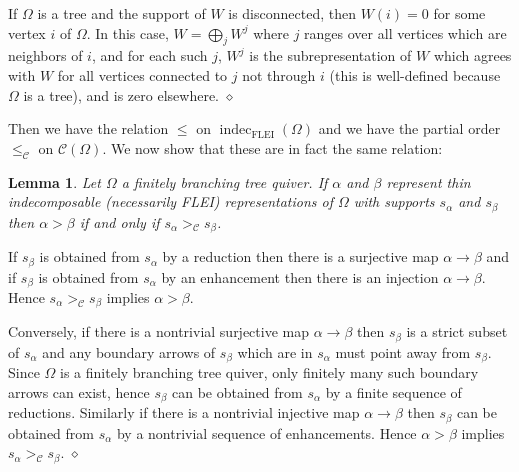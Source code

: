 \documentclass{article}
\newtheorem{lemma}{Lemma}[section]
\newenvironment{proof}{\vspace*{2ex}\noindent {\em Proof:}
}{\hfill $\diamond$ \\[2ex]}
\begin{document}
\begin{proof}
If $\Omega$ is a tree and the support of $W$ is disconnected, then $W(i) = 0$ for some vertex $i$ of $\Omega$. In this case, $W = \bigoplus_{j} W^j$ where $j$ ranges over all vertices which are neighbors of $i$, and for each such $j$, $W^j$ is the subrepresentation of $W$ which agrees with $W$ for all vertices connected to $j$ not through $i$ (this is well-defined because $\Omega$ is a tree), and is zero elsewhere. 
\end{proof}

Then we have the relation $\leq$ on $\operatorname{indec}_\text{FLEI}(\Omega)$ and we have the partial order $\leq_\mathcal{C}$ on $\mathcal{C}(\Omega)$. We now show that these are in fact the same relation:

\begin{lemma}\label{lem: the two relations on type A are the same}
       Let $\Omega$ a finitely branching tree quiver. If $\alpha$ and $\beta$ represent thin indecomposable (necessarily FLEI) representations of $\Omega$ with supports $s_\alpha$ and $s_\beta$ then $\alpha > \beta$ if and only if $s_\alpha >_{\mathcal{C}} s_\beta$.  
\end{lemma}

\begin{proof}
If $s_\beta$ is obtained from $s_\alpha$ by a reduction then there is a surjective map $\alpha \to \beta$ and if $s_\beta$ is obtained from $s_\alpha$ by an enhancement then there is an injection $\alpha \to \beta$. Hence $s_\alpha >_{\mathcal{C}} s_\beta$ implies $\alpha > \beta$. 


Conversely, if there is a nontrivial surjective map $\alpha \to \beta$ then $s_\beta$ is a strict subset of $s_\alpha$ and any boundary arrows of $s_\beta$ which are in $s_\alpha$ must point away from $s_\beta$. Since $\Omega$ is a finitely branching tree quiver, only finitely many such boundary arrows can exist, hence $s_\beta$ can be obtained from $s_\alpha$ by a finite sequence of reductions. Similarly if there is a nontrivial injective map $\alpha \to \beta$ then $s_\beta$ can be obtained from $s_\alpha$ by a nontrivial sequence of enhancements. Hence $\alpha > \beta$ implies $s_\alpha >_{\mathcal{C}} s_\beta$. 
\end{proof}
\end{document}
